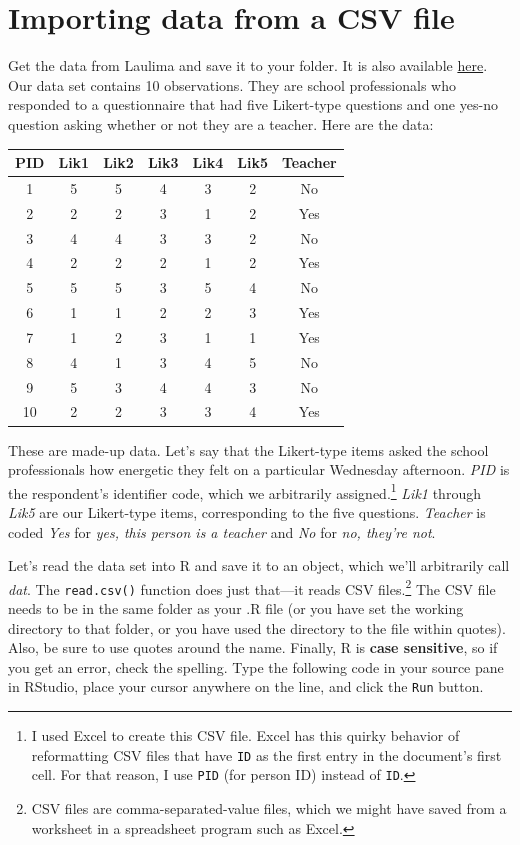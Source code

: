 \documentclass[
]{article}
\begin{document}
\hypertarget{importing}{%
\section{Importing data from a CSV file}\label{importing}}

Get the data from Laulima and save it to your folder. It is also available \href{http://www2.hawaii.edu/~georgeha/Handouts/SchoolSurvey.csv}{here}.
Our data set contains 10 observations. They are school professionals who responded to a questionnaire that had five Likert-type questions and one yes-no question asking whether or not they are a teacher.
Here are the data:

\begin{tabular}{c|c|c|c|c|c|c}
\hline
PID & Lik1 & Lik2 & Lik3 & Lik4 & Lik5 & Teacher\\
\hline
1 & 5 & 5 & 4 & 3 & 2 & No\\
\hline
2 & 2 & 2 & 3 & 1 & 2 & Yes\\
\hline
3 & 4 & 4 & 3 & 3 & 2 & No\\
\hline
4 & 2 & 2 & 2 & 1 & 2 & Yes\\
\hline
5 & 5 & 5 & 3 & 5 & 4 & No\\
\hline
6 & 1 & 1 & 2 & 2 & 3 & Yes\\
\hline
7 & 1 & 2 & 3 & 1 & 1 & Yes\\
\hline
8 & 4 & 1 & 3 & 4 & 5 & No\\
\hline
9 & 5 & 3 & 4 & 4 & 3 & No\\
\hline
10 & 2 & 2 & 3 & 3 & 4 & Yes\\
\hline
\end{tabular}

These are made-up data. Let's say that the Likert-type items asked the school professionals how energetic they felt on a particular Wednesday afternoon. \emph{PID} is the respondent's identifier code, which we arbitrarily assigned.\footnote{I used Excel to create this CSV file. Excel has this quirky behavior of reformatting CSV files that have \texttt{ID} as the first entry in the document's first cell. For that reason, I use \texttt{PID} (for person ID) instead of \texttt{ID}.} \emph{Lik1} through \emph{Lik5} are our Likert-type items, corresponding to the five questions. \emph{Teacher} is coded \emph{Yes} for \emph{yes, this person is a teacher} and \emph{No} for \emph{no, they're not}.

Let's read the data set into R and save it to an object, which we'll arbitrarily call \emph{dat}. The \texttt{read.csv()} function does just that---it reads CSV files.\footnote{CSV files are comma-separated-value files, which we might have saved from a worksheet in a spreadsheet program such as Excel.} The CSV file needs to be in the same folder as your .R file (or you have set the working directory to that folder, or you have used the directory to the file within quotes). Also, be sure to use quotes around the name. Finally, R is \textbf{case sensitive}, so if you get an error, check the spelling. Type the following code in your source pane in RStudio, place your cursor anywhere on the line, and click the \texttt{Run} button.
\end{document}
